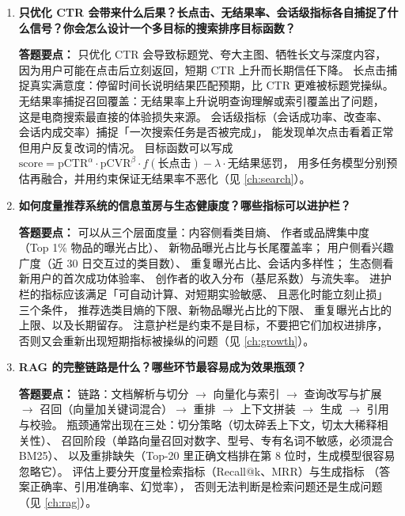 \begin{interview}[题库与答题要点]

\begin{enumerate}[label=]

  \item[\textcolor{VioletDeep}{\textbf{Q44.}}] \textbf{只优化 CTR 会带来什么后果？长点击、无结果率、会话级指标各自捕捉了什么信号？你会怎么设计一个多目标的搜索排序目标函数？}
\par\smallskip\noindent\textcolor{VioletDeep}{\textbf{答题要点：}}
只优化 CTR 会导致标题党、夸大主图、牺牲长文与深度内容，
因为用户可能在点击后立刻返回，短期 CTR 上升而长期信任下降。
长点击捕捉真实满意度：停留时间长说明结果匹配预期，比 CTR 更难被标题党操纵。
无结果率捕捉召回覆盖：无结果率上升说明查询理解或索引覆盖出了问题，
这是电商搜索最直接的体验损失来源。
会话级指标（会话成功率、改查率、会话内成交率）捕捉「一次搜索任务是否被完成」，
能发现单次点击看着正常但用户反复改词的情况。
目标函数可以写成 $\text{score} = \text{pCTR}^{\alpha}\cdot\text{pCVR}^{\beta}
  \cdot f(\text{长点击}) - \lambda\cdot\text{无结果惩罚}$，
用多任务模型分别预估再融合，并用约束保证无结果率不恶化（见 \cref{ch:search}）。

  \item[\textcolor{VioletDeep}{\textbf{Q45.}}] \textbf{如何度量推荐系统的信息茧房与生态健康度？哪些指标可以进护栏？}
\par\smallskip\noindent\textcolor{VioletDeep}{\textbf{答题要点：}}
可以从三个层面度量：内容侧看类目熵、
作者或品牌集中度（Top 1\% 物品的曝光占比）、
新物品曝光占比与长尾覆盖率；
用户侧看兴趣广度（近 30 日交互过的类目数）、
重复曝光占比、会话内多样性；
生态侧看新用户的首次成功体验率、
创作者的收入分布（基尼系数）与流失率。
进护栏的指标应该满足「可自动计算、对短期实验敏感、
且恶化时能立刻止损」三个条件，
推荐选类目熵的下限、新物品曝光占比的下限、
重复曝光占比的上限、以及长期留存。
注意护栏是约束不是目标，不要把它们加权进排序，
否则又会重新出现短期指标被操纵的问题（见 \cref{ch:growth}）。

  \item[\textcolor{VioletDeep}{\textbf{Q46.}}] \textbf{RAG 的完整链路是什么？哪些环节最容易成为效果瓶颈？}
\par\smallskip\noindent\textcolor{VioletDeep}{\textbf{答题要点：}}
链路：文档解析与切分 $\to$ 向量化与索引 $\to$ 查询改写与扩展 $\to$
召回（向量加关键词混合）$\to$ 重排 $\to$ 上下文拼装 $\to$ 生成 $\to$ 引用与校验。
瓶颈通常出现在三处：切分策略（切太碎丢上下文，切太大稀释相关性）、
召回阶段（单路向量召回对数字、型号、专有名词不敏感，必须混合 BM25）、
以及重排缺失（Top-20 里正确文档排在第 8 位时，生成模型很容易忽略它）。
评估上要分开度量检索指标（Recall@k、MRR）与生成指标
（答案正确率、引用准确率、幻觉率），
否则无法判断是检索问题还是生成问题（见 \cref{ch:rag}）。


\end{enumerate}
\end{interview}
